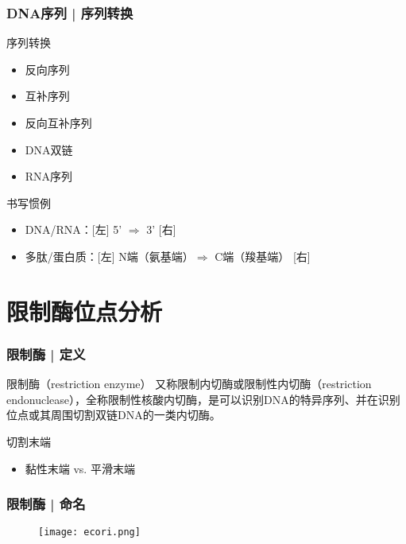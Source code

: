 \begin{frame}
  \frametitle{DNA序列 | 序列转换}
  \begin{block}{序列转换}
    \begin{itemize}
      \item 反向序列
      \item 互补序列
      \item 反向互补序列
      \item DNA双链
      \item RNA序列
    \end{itemize}
  \end{block}
  \pause
  \begin{block}{书写惯例}
    \begin{itemize}
      \item DNA/RNA：[左] 5' $\Longrightarrow$ 3' [右]
      \item 多肽/蛋白质：[左] N端（氨基端）$\Longrightarrow$ C端（羧基端） [右]
    \end{itemize}
  \end{block}
\end{frame}

\section{限制酶位点分析}
\begin{frame}
  \frametitle{限制酶 | 定义}
  \begin{block}{限制酶（restriction enzyme）}
    又称限制内切酶或限制性内切酶（restriction endonuclease），全称限制性核酸内切酶，是可以识别DNA的特异序列、并在识别位点或其周围切割双链DNA的一类内切酶。
  \end{block}
  \pause
  \begin{block}{切割末端}
    \begin{itemize}
      \item 黏性末端 vs. 平滑末端
    \end{itemize}
  \end{block}
  \begin{figure}
    \centering
  \end{figure}
\end{frame}

\begin{frame}
  \frametitle{限制酶 | \alert{命名}}
  \begin{figure}
    \centering
    \texttt{[image: ecori.png]}
  \end{figure}
\end{frame}


